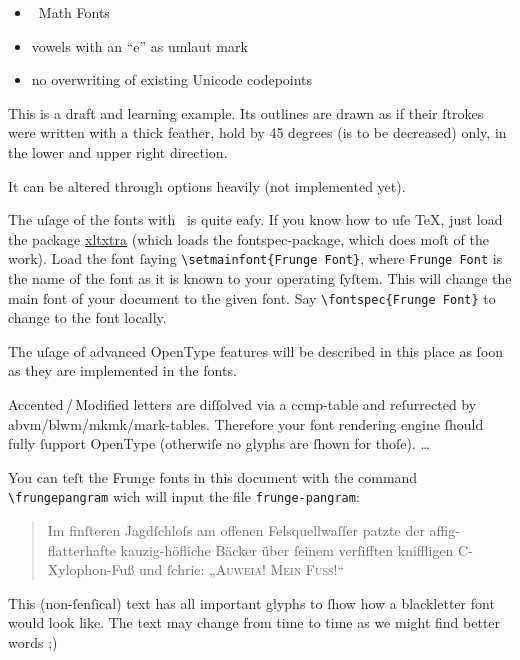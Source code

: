 \documentclass[
   titlepage=no,
   bibliography=totoc,
   ]{scrartcl} %
\newcommand*\winkey{;)}
\newcommand*\pkg[1]{\textsf{#1}}
\newcommand\frungepangram{Im finſteren Jagdſchloſs am offenen Felsquellwaſſer patzte der affig-flatterhafte kauzig-höf\/liche Bäcker über ſeinem verſifften kniffligen C-Xylophon-Fuß und ſchrie: „\textsc{Auweia! Mein Fuß!}“}
\begin{document}
 \begin{itemize}
  \item \XeTeX\ Math Fonts
  \item vowels with an “e” as umlaut mark
  \item no overwriting of existing Unicode codepoints
 \end{itemize}



This is a draft and learning example. Its outlines are drawn as if their
ſtrokes were written with a thick feather, hold by 45 degrees (is to be
decreased) only, in the lower and upper right direction.

It can be altered through options heavily (not implemented yet).


The uſage of the fonts with \XeTeX\ is quite eaſy. If you know how to
uſe \TeX, just load the package
\href{http://www.ctan.org/tex-archive/macros/xetex/latex/xltxtra/}{\pkg{xltxtra}}
(which loads the \pkg{fontspec}-package, which does moſt of the work).
Load the font ſaying \verb|\setmainfont{Frunge Font}|, where
\verb|Frunge Font| is the name of the font as it is known to your
operating ſyſtem. This will change the main font of your document to the
given font. Say \verb|\fontspec{Frunge Font}| to change to the font
locally.

The uſage of advanced OpenType features will be described in this place
as ſoon as they are implemented in the fonts.


Accented\,/\,Modified letters are diſſolved via a ccmp-table and
reſurrected by abvm/blwm/mkmk/mark-tables. Therefore your font rendering
engine ſhould fully ſupport OpenType (otherwiſe no glyphs are ſhown for
thoſe). …


You can teſt the Frunge fonts in this document with the command
\verb|\frungepangram| wich will input the file \verb|frunge-pangram|:
 \begin{quote}
  \frungepangram
 \end{quote}
 This (non-ſenſical) text has all important glyphs to ſhow how a
blackletter font would look like. The text may change from time to time
as we might find better words \winkey
\end{document}
